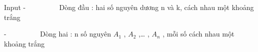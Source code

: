 Input  
-          Dòng đầu : hai số nguyên dương n và k, cách nhau một khoảng trắng  

   -          Dòng hai : n số nguyên $A_{1}$   , $A_{2}$   ,… , $A_{n}$   , mỗi số cách nhau một khoảng trắng